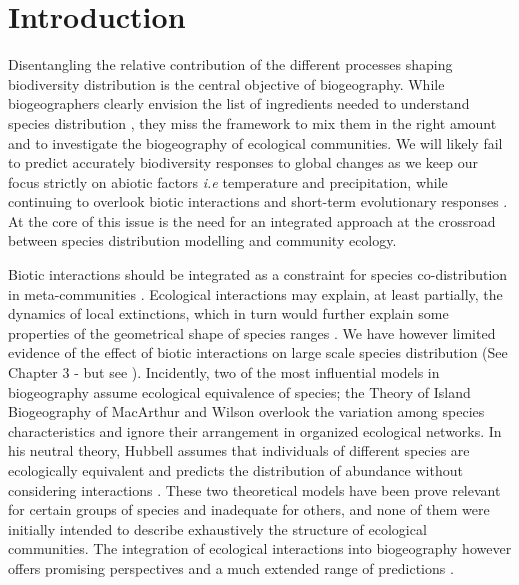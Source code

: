 \section{Introduction}\label{introduction}

Disentangling the relative contribution of the different processes
shaping biodiversity distribution is the central objective of
biogeography. While biogeographers clearly envision the list of
ingredients needed to understand species distribution
\citep{Thuiller2013}, they miss the framework to mix them in the right
amount and to investigate the biogeography of ecological communities. We
will likely fail to predict accurately biodiversity responses to global
changes as we keep our focus strictly on abiotic factors \emph{i.e}
temperature and precipitation, while continuing to overlook biotic
interactions \citep{Wiens2011} and short-term evolutionary responses
\citep{Lavergne2010}. At the core of this issue is the need for an
integrated approach at the crossroad between species distribution
modelling and community ecology.

Biotic interactions should be integrated as a constraint for species
co-distribution in meta-communities \citep{Jabot2012, Cazelles2015a}.
Ecological interactions may explain, at least partially, the dynamics of
local extinctions, which in turn would further explain some properties
of the geometrical shape of species ranges \citep[\emph{e.g.} nested
distributions of parasitoid and its host,][]{Shenbrot2007}. We have
however limited evidence of the effect of biotic interactions on large
scale species distribution (See Chapter 3 - but see
\citet{Gotelli2010}). Incidently, two of the most influential models in
biogeography assume ecological equivalence of species; the Theory of
Island Biogeography of MacArthur and Wilson \citep[hereafter
TIB,][]{MacArthur1967} overlook the variation among species
characteristics and ignore their arrangement in organized ecological
networks. In his neutral theory, Hubbell assumes that individuals of
different species are ecologically equivalent and predicts the
distribution of abundance without considering interactions
\citep{Hubbell1997}. These two theoretical models have been prove
relevant for certain groups of species and inadequate for others, and
none of them were initially intended to describe exhaustively the
structure of ecological communities. The integration of ecological
interactions into biogeography however offers promising perspectives and
a much extended range of predictions \citep{Holt2010, Gravel2011}.

